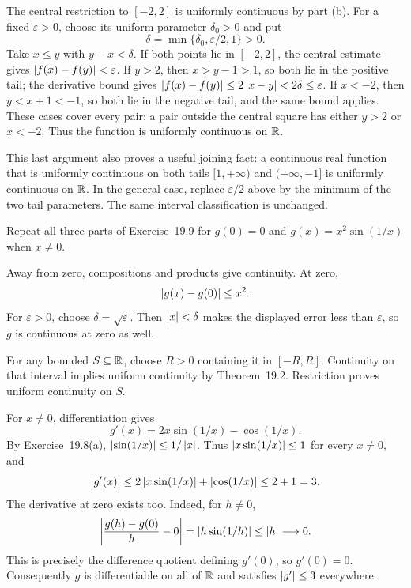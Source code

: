The central restriction to $[-2,2]$ is uniformly continuous
by part (b). For a fixed $\varepsilon>0$, choose its uniform
parameter $\delta_0>0$ and put
\[
 \delta=\min\{\delta_0,\varepsilon/2,1\}>0.
\]
Take $x\le y$ with $y-x<\delta$.
If both points lie in $[-2,2]$, the central estimate gives
$\left|f(x)-f(y)\right|<\varepsilon$.
If $y>2$, then $x>y-1>1$, so both lie in the positive tail;
the derivative bound gives
$\left|f(x)-f(y)\right|\le2\left|x-y\right|<2\delta\le\varepsilon$.
If $x<-2$, then $y<x+1<-1$, so both lie in the negative
tail, and the same bound applies.
These cases cover every pair: a pair outside the central square
has either $y>2$ or $x<-2$. Thus the function is uniformly
continuous on $\mathbb{R}$.

This last argument also proves a useful joining fact: a continuous
real function that is uniformly continuous on both tails
$[1,+\infty)$ and $(-\infty,-1]$ is uniformly continuous on
$\mathbb{R}$. In the general case, replace $\varepsilon/2$ above by
the minimum of the two tail parameters. The same interval
classification is unchanged.

\goal Repeat all three parts of Exercise~19.9 for
$g(0)=0$ and $g(x)=x^2\sin(1/x)$ when $x\ne0$.

Away from zero, compositions and products give continuity.
At zero,
\[
 \left|g(x)-g(0)\right|\le x^2.
\]
For $\varepsilon>0$, choose $\delta=\sqrt\varepsilon$.
Then $\left|x\right|<\delta$ makes the displayed error less than
$\varepsilon$, so $g$ is continuous at zero as well.

For any bounded $S\subseteq\mathbb{R}$, choose $R>0$ containing it
in $[-R,R]$. Continuity on that interval implies uniform
continuity by Theorem~19.2. Restriction proves uniform continuity
on $S$.

For $x\ne0$, differentiation gives
\[
 g'(x)=2x\sin(1/x)-\cos(1/x).
\]
By Exercise~19.8(a), $\left|\sin(1/x)\right|\le1/\left|x\right|$.
Thus $\left|x\sin(1/x)\right|\le1$ for every $x\ne0$, and
\[
 \left|g'(x)\right|\le2\left|x\sin(1/x)\right|+\left|\cos(1/x)\right|
 \le2+1=3.
\]
The derivative at zero exists too. Indeed, for $h\ne0$,
\[
 \left|\frac{g(h)-g(0)}{h}-0\right|
 =\left|h\sin(1/h)\right|\le\left|h\right|\longrightarrow0.
\]
This is precisely the difference quotient defining $g'(0)$,
so $g'(0)=0$. Consequently $g$ is differentiable on all of
$\mathbb{R}$ and satisfies $\left|g'\right|\le3$ everywhere.

